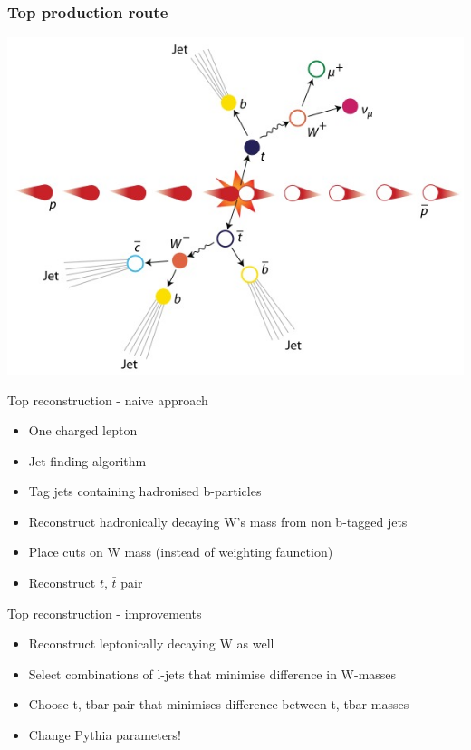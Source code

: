 \documentclass{beamer}
\begin{document}
  \begin{frame}
    \frametitle{Top production route}
    \includegraphics[height=0.89\textheight]{ttbar.jpg}
  \end{frame}

  \begin{frame}{Top reconstruction - naive approach}
    \begin{itemize}[<uncover@+>]
      \item One charged lepton
      \item Jet-finding algorithm
      \item Tag jets containing hadronised b-particles 
      \item Reconstruct hadronically decaying W's mass from non b-tagged jets
      \item Place cuts on W mass (instead of weighting faunction)
      \item Reconstruct $t$, $\bar{t}$ pair
    \end{itemize}
  \end{frame}

  \begin{frame}{Top reconstruction - improvements}
    \begin{itemize}[<uncover@+>]
      \item Reconstruct leptonically decaying W as well
      \item Select combinations of l-jets that minimise difference in W-masses
      \item Choose t, tbar pair that minimises difference between t, tbar masses
      \item Change Pythia parameters!
    \end{itemize}
  \end{frame}
\end{document}
